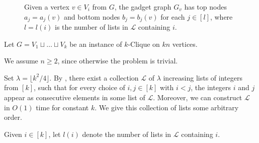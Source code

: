 \documentclass[11pt]{article}
\newcommand{\ca}{\mathcal}
\theoremstyle{definition}
\begin{document}

\begin{figure}[t]
    \centering
    
    \caption{
    Given a vertex $v\in V_i$ from $G$, the gadget graph $G_v$ has top nodes $a_j = a_j(v)$ and bottom nodes $b_j = b_j(v)$ for each $j\in [l]$, where $l=l(i)$ is the number of lists in $\ca{L}$ containing  $i$.}
    \label{fig:k-DP-gadget}
\end{figure}

    Let $G = V_1\sqcup \dots \sqcup V_k$ be an instance of \textsf{$k$-Clique} on $kn$ vertices.
    
    We assume $n\ge 2$, since otherwise the problem is trivial.

    Set $\lambda = \lfloor k^2/4\rfloor$.
    By , there exist a collection $\ca{L}$ of $\lambda$ increasing lists of integers from $[k]$, such that for every choice of $i,j\in [k]$ with $i < j$, the integers $i$ and $j$ appear as consecutive elements in some list of $\ca{L}$.
    Moreover, we can construct $\ca{L}$ in $O(1)$ time for constant $k$.
    We give this collection of lists some arbitrary order.
    
    Given $i\in [k]$, let $l(i)$ denote the number of lists in $\ca{L}$ containing $i$.
\end{document}

